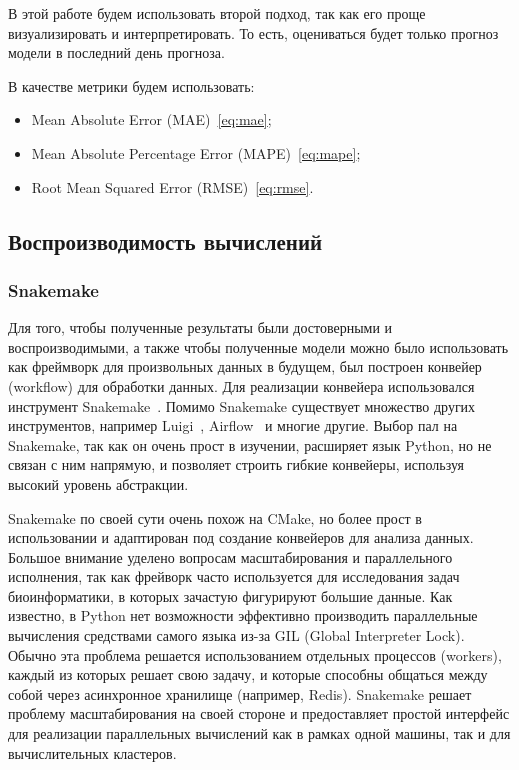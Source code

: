 \documentclass[a4paper,article,14pt]{extarticle}
\begin{document}
\par
В этой работе будем использовать второй подход, так как его проще визуализировать и интерпретировать.
То есть, оцениваться будет только прогноз модели в последний день прогноза.

В качестве метрики будем использовать:
\begin{itemize}
    \item Mean Absolute Error (MAE)~\eqref{eq:mae};
    \item Mean Absolute Percentage Error (MAPE)~\eqref{eq:mape};
    \item Root Mean Squared Error (RMSE)~\eqref{eq:rmse}.
\end{itemize}

\subsection{Воспроизводимость вычислений}

\subsubsection{Snakemake}
Для того, чтобы полученные результаты были достоверными и воспроизводимыми, а также чтобы полученные модели можно было использовать как фреймворк для произвольных данных в будущем, был построен конвейер (workflow) для обработки данных.
Для реализации конвейера использовался инструмент Snakemake~\cite{snakemake}.
Помимо Snakemake существует множество других инструментов, например Luigi~\cite{luigi}, Airflow~\cite{airflow} и многие другие.
Выбор пал на Snakemake, так как он очень прост в изучении, расширяет язык Python, но не связан с ним напрямую, и позволяет строить гибкие конвейеры, используя высокий уровень абстракции.
\par

Snakemake по своей сути очень похож на CMake, но более прост в использовании и адаптирован под создание конвейеров для анализа данных.
Большое внимание уделено вопросам масштабирования и параллельного исполнения, так как фрейворк часто используется для исследования задач биоинформатики, в которых зачастую фигурируют большие данные.
Как известно, в Python нет возможности эффективно производить параллельные вычисления средствами самого языка из-за GIL (Global Interpreter Lock).
Обычно эта проблема решается использованием отдельных процессов (workers), каждый из которых решает свою задачу, и которые способны общаться между собой через асинхронное хранилище (например, Redis).
Snakemake решает проблему масштабирования на своей стороне и предоставляет простой интерфейс для реализации параллельных вычислений как в рамках одной машины, так и для вычислительных кластеров.
\par
\end{document}
